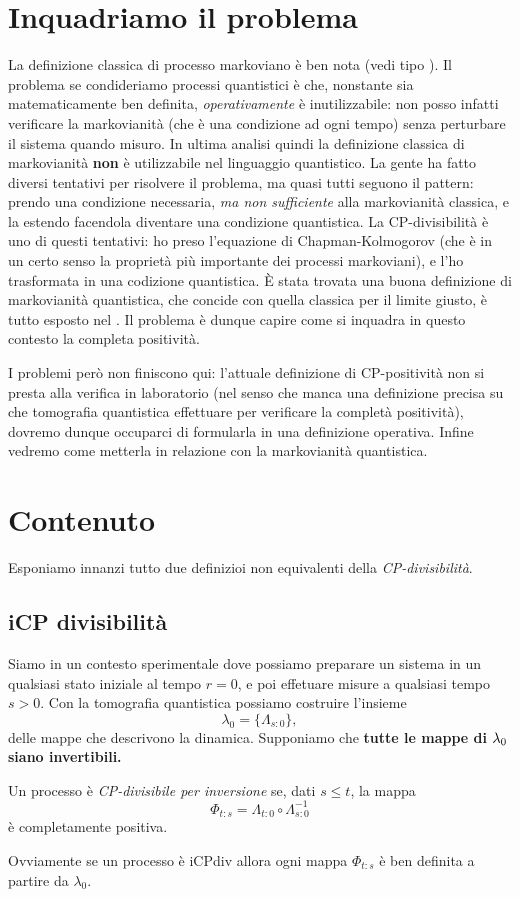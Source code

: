 \documentclass[a4]{article}
\begin{document}
\section{Inquadriamo il problema}
La definizione classica di processo markoviano è ben nota (vedi tipo \cite{breuer2007theory, markovcondition}).
Il problema se condideriamo processi quantistici è che, nonstante sia matematicamente
ben definita, \emph{operativamente} è inutilizzabile: non posso infatti verificare
la markovianità (che è una condizione ad  ogni tempo) senza perturbare il sistema
quando misuro. In ultima analisi quindi  la definizione classica di markovianità
\textbf{non} è utilizzabile nel linguaggio quantistico.
La gente ha fatto diversi tentativi per risolvere il problema, ma quasi tutti seguono
il pattern: prendo una condizione necessaria, \emph{ma non sufficiente} alla markovianità
classica, e la estendo facendola diventare una condizione quantistica. La CP-divisibilità
è uno di questi tentativi: ho preso l'equazione di Chapman-Kolmogorov (che è in un certo
senso la proprietà più importante dei processi markoviani), e l'ho trasformata in una
codizione  quantistica.
È stata  trovata una buona definizione di markovianità quantistica, che concide con
quella classica per il limite giusto, è tutto esposto nel \cite{markovcondition}.
Il problema è dunque capire come si inquadra in questo  contesto la completa positività.

I problemi però non finiscono qui: l'attuale definizione di CP-positività non si presta alla
verifica in laboratorio  (nel senso  che manca una definizione precisa su che tomografia
quantistica effettuare per verificare la completà positività), dovremo dunque occuparci
di formularla in una definizione operativa.
Infine vedremo come metterla in relazione con la markovianità quantistica.

\section{Contenuto}
Esponiamo innanzi tutto due definizioi non equivalenti della \emph{CP-divisibilità}.

\subsection{iCP divisibilità}
Siamo in un contesto sperimentale dove possiamo preparare un sistema in un qualsiasi
stato iniziale al tempo \(r=0\), e poi effetuare misure a qualsiasi tempo \(s>0\).
Con la tomografia  quantistica  possiamo costruire  l'insieme
\[  \lambda_0 = \{\Lambda_{s\colon0}\}, \]
delle mappe che descrivono la dinamica. Supponiamo che \textbf{tutte le mappe di
\(\boldmath{\lambda_0}\) siano invertibili.}
\begin{defn}
Un processo è \emph{CP-divisibile per inversione} se, dati \(s \le  t\), la mappa
\[\Phi_{t\colon s} = \Lambda_{t\colon0} \circ \Lambda^{-1}_{s\colon0}\]
è completamente positiva.
\end{defn}
Ovviamente se un processo è iCPdiv allora ogni mappa \(\Phi_{t\colon s}\) è ben definita
a partire da \(\lambda_0\).
\end{document}
